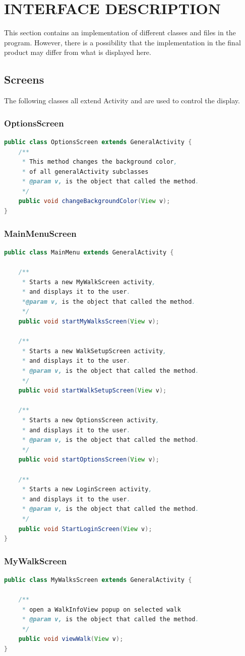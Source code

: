 \documentclass[12pt]{article}
\begin{document}
\section{INTERFACE DESCRIPTION}
This section contains an implementation of different classes and files in the program. However, there is a possibility that the implementation in the final product may differ from what is displayed here.
\subsection{Screens}
The following classes all extend Activity and are used to control the display.
\subsubsection{OptionsScreen}
\begin{lstlisting}[language=java]
public class OptionsScreen extends GeneralActivity {
	/**
	 * This method changes the background color,
	 * of all generalActivity subclasses
	 * @param v, is the object that called the method.
	 */
	public void changeBackgroundColor(View v);
}
\end{lstlisting}
\subsubsection{MainMenuScreen}
\begin{lstlisting}[language=java]
public class MainMenu extends GeneralActivity {

	/**
	 * Starts a new MyWalkScreen activity,
	 * and displays it to the user.
	 *@param v, is the object that called the method.
	 */
	public void startMyWalksScreen(View v);

	/**
	 * Starts a new WalkSetupScreen activity,
	 * and displays it to the user.
	 * @param v, is the object that called the method.
	 */
	public void startWalkSetupScreen(View v);
	
	/**
	 * Starts a new OptionsScreen activity,
	 * and displays it to the user.
	 * @param v, is the object that called the method.
	 */
	public void startOptionsScreen(View v);

	/**
	 * Starts a new LoginScreen activity,
	 * and displays it to the user.
	 * @param v, is the object that called the method.
	 */
	public void StartLoginScreen(View v);
}
\end{lstlisting}
\subsubsection{MyWalkScreen}
\begin{lstlisting}[language=java]
public class MyWalksScreen extends GeneralActivity {
	
	/**
	 * open a WalkInfoView popup on selected walk
	 * @param v, is the object that called the method.
	 */
	public void viewWalk(View v);
}
\end{lstlisting}
\end{document}
